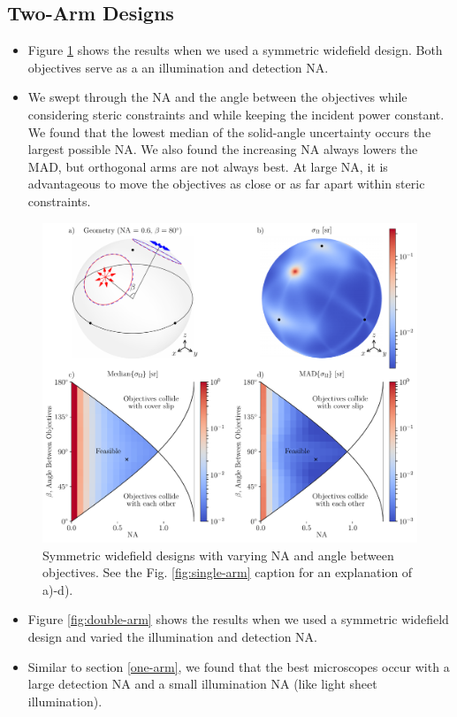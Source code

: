 \documentclass[10pt]{article}
\begin{document}
\subsection{Two-Arm Designs}
\begin{itemize}
\item Figure \ref{fig:symmetric-widefield} shows the results when we used a
  symmetric widefield design. Both objectives serve as a an illumination and
  detection NA.
\item We swept through the NA and the angle between the objectives while
  considering steric constraints and while keeping the incident power constant.
  We found that the lowest median of the solid-angle uncertainty occurs the largest
  possible NA. We also found the increasing NA always lowers the MAD, but orthogonal
  arms are not always best. At large NA, it is advantageous to move the objectives
  as close or as far apart within steric constraints. 
\end{itemize}

\begin{figure}[htbp]
\centering\includegraphics[width=\textwidth]{symmetric-widefield}
\caption{Symmetric widefield designs with varying NA and angle between objectives. See the Fig. \ref{fig:single-arm} caption for an explanation of a)-d).}
\label{fig:symmetric-widefield}
\end{figure}

\begin{itemize}
\item Figure \ref{fig:double-arm} shows the results when we used a
  symmetric widefield design and varied the illumination and detection NA. 
\item Similar to section \ref{one-arm}, we found that the best microscopes occur
  with a large detection NA and a small illumination NA (like light sheet illumination).
\end{itemize}
\end{document}
